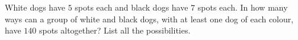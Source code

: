 White dogs have $5$ spots each and black dogs have $7$ spots each. In how many ways can a group of white and black dogs, with at least one dog of each colour, have $140$ spots altogether? List all the possibilities.
